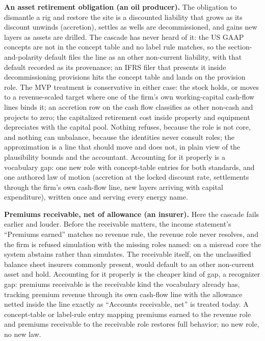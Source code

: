 \documentclass[11pt]{article}
\newcommand{\lead}[2]{\par\addvspace{5pt}\textbf{\textcolor{#1}{#2}}}
\begin{document}
\lead{navytwo}{An asset retirement obligation (an oil producer).} The obligation to dismantle a rig and restore the site is a discounted liability that grows as its discount unwinds (accretion), settles as wells are decommissioned, and gains new layers as assets are drilled. The cascade has never heard of it: the US GAAP concepts are not in the concept table and no label rule matches, so the section-and-polarity default files the line as an other non-current liability, with that default recorded as its provenance; an IFRS filer that presents it inside decommissioning provisions hits the concept table and lands on the provision role. The MVP treatment is conservative in either case: the stock holds, or moves to a revenue-scaled target where one of the firm's own working-capital cash-flow lines binds it; an accretion row on the cash flow classifies as other non-cash and projects to zero; the capitalized retirement cost inside property and equipment depreciates with the capital pool. Nothing refuses, because the role is not core, and nothing can unbalance, because the identities never consult roles; the approximation is a line that should move and does not, in plain view of the plausibility bounds and the accountant. Accounting for it properly is a vocabulary gap: one new role with concept-table entries for both standards, and one authored law of motion (accretion at the locked discount rate, settlements through the firm's own cash-flow line, new layers arriving with capital expenditure), written once and serving every energy name.

\lead{navytwo}{Premiums receivable, net of allowance (an insurer).} Here the cascade fails earlier and louder. Before the receivable matters, the income statement's ``Premiums earned'' matches no revenue rule, the revenue role never resolves, and the firm is refused simulation with the missing roles named: on a misread core the system abstains rather than simulates. The receivable itself, on the unclassified balance sheet insurers commonly present, would default to an other non-current asset and hold. Accounting for it properly is the cheaper kind of gap, a recognizer gap: premiums receivable is the receivable kind the vocabulary already has, tracking premium revenue through its own cash-flow line with the allowance netted inside the line exactly as ``Accounts receivable, net'' is treated today. A concept-table or label-rule entry mapping premiums earned to the revenue role and premiums receivable to the receivable role restores full behavior; no new role, no new law.
\end{document}

